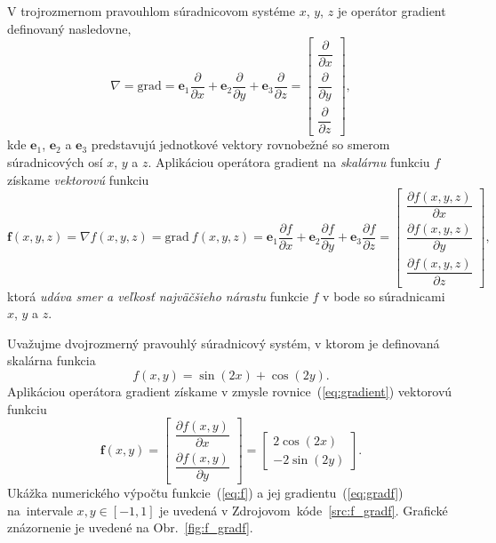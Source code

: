 \documentclass[a4paper, 12pt]{book}
\newcommand{\grad}{\mathrm{grad}}
\let\vec\mathbf
\begin{document}
V trojrozmernom pravouhlom súradnicovom systéme $x$, $y$, $z$ je operátor 
gradient definovaný nasledovne,
%
\begin{equation}
\label{eq:gradient}
\nabla = \grad = \vec e_1 \frac{\partial}{\partial x} + \vec e_2 
\frac{\partial}{\partial y} + \vec e_3 \frac{\partial}{\partial z} =
\begin{bmatrix}
\dfrac{\partial}{\partial x} \\[2ex]
\dfrac{\partial}{\partial y} \\[2ex]
\dfrac{\partial}{\partial z}
\end{bmatrix}
{,}
\end{equation}
%
kde $\vec e_1$, $\vec e_2$ a $\vec e_3$ predstavujú jednotkové vektory 
rovnobežné so smerom súradnicových osí $x$, $y$ a $z$.  Aplikáciou operátora 
gradient na \emph{skalárnu} funkciu $f$ získame \emph{vektorovú} funkciu
%
\begin{equation}
\vec f(x, y, z) = \nabla f(x, y, z) = \grad \ f(x, y, z) = \vec e_1 
\frac{\partial f}{\partial x} + \vec e_2 \frac{\partial f}{\partial y} + \vec 
e_3 \frac{\partial f}{\partial z} =
\begin{bmatrix}
\dfrac{\partial f(x, y, z)}{\partial x} \\[2ex]
\dfrac{\partial f(x, y, z)}{\partial y} \\[2ex]
\dfrac{\partial f(x, y, z)}{\partial z}
\end{bmatrix}
{,}
\end{equation}
%
ktorá \emph{udáva smer a veľkosť najväčšieho nárastu} funkcie $f$ v bode so 
súradnicami $x$, $y$ a $z$.

Uvažujme dvojrozmerný pravouhlý súradnicový systém, v ktorom je definovaná 
skalárna funkcia
%
\begin{equation}
\label{eq:f}
f(x, y) = \sin(2x) + \cos(2y){.}
\end{equation}
%
Aplikáciou operátora gradient získame v zmysle rovnice~(\ref{eq:gradient}) 
vektorovú funkciu
%
\begin{equation}
\label{eq:gradf}
\vec f(x, y) =
\begin{bmatrix}
\dfrac{\partial f(x, y)}{\partial x} \\[2ex]
\dfrac{\partial f(x, y)}{\partial y}
\end{bmatrix}
=
\begin{bmatrix}
2 \cos(2x) \\[2ex]
-2 \sin(2y)
\end{bmatrix}
{.}
\end{equation}
%
Ukážka numerického výpočtu funkcie~(\ref{eq:f}) a jej 
gradientu~(\ref{eq:gradf}) na~intervale $x, y \in [-1, 1]$ je uvedená 
v Zdrojovom~kóde~\ref{src:f_gradf}.  Grafické znázornenie je uvedené na 
Obr.~\ref{fig:f_gradf}.
\end{document}
